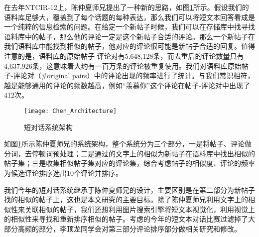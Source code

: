 在去年NTCIR-12上，陈仲夏师兄提出了一种新的思路，如图\ref{fig:Chen_Architecture}所示。假设我们的语料库足够大，覆盖到了每个话题的每种表达，那么我们可以将短文本回答看成是一个纯粹的信息检索的问题。在给定一个新帖子时候，我们可以在存储库中找寻找语料库中的帖子，那么他的评论一定是这个新帖子合适的评论。那么一个新帖子在我们语料库中能找到相似的帖子，他对应的评论很可能是新帖子合适的回复。值得注意的是，语料库的原始帖子-评论对有5,648,128条，而去重后的评论数量只有4,637,926条，这意味着大约有一百万条的评论被重复使用。我们对语料库原始帖子-评论对（\#original pairs）中的评论出现的频率进行了统计。与我们常识相符，越是能够通用的评论的频数越高，例如“羡慕你”这个评论在帖子-评论对中出现了412次。

\begin{figure}[ht]
\centering
\texttt{[image: Chen\_Architecture]}
\caption{短对话系统架构} \label{fig:Chen_Architecture}
\end{figure}

如图\ref{fig:Chen_Architecture}所示陈仲夏师兄的系统架构\cite{chenmicrosoft}，整个系统分为三个部分，一是将帖子、评论做分词，去停顿词预处理；二是通过的文字上的相似为新帖子在语料库中找出相似的帖子集；三是收集相似帖子集对应的评论集，综合考虑帖子的相似度、评论的频率为候选评论排序选出10个评论并排序。

我们今年的短对话系统继承于陈仲夏师兄的设计，主要区别是在第二部分为新帖子找的相似的帖子上，这也是本文研究的主要目标。除了陈仲夏师兄利用文字上的相似性来关联相似的帖子，我们还想利用图片搜索引擎将短文本视觉化，利用视觉上的相似性来寻找和重新排序相似的帖子。考虑的今年的短文本对话比赛过滤掉了大部分高频的部分，李顶龙同学会对第三部分评论排序部分做相关研究和修改。







